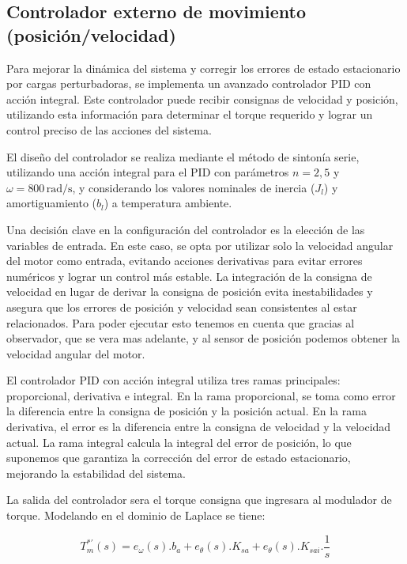 \documentclass{article}
\begin{document}

\subsection{Controlador externo de movimiento (posición/velocidad)}

Para mejorar la dinámica del sistema y corregir los errores de estado estacionario por cargas perturbadoras, 
se implementa un avanzado controlador PID con acción integral. Este controlador puede recibir consignas de 
velocidad y posición, utilizando esta información para determinar el torque requerido y lograr un control 
preciso de las acciones del sistema.

El diseño del controlador se realiza mediante el método de sintonía serie, utilizando una acción integral 
para el PID con parámetros $n=2,5$ y $\omega=800 \, \text{rad/s}$, y considerando los valores nominales de 
inercia ($J_l$) y amortiguamiento ($b_l$) a temperatura ambiente.

Una decisión clave en la configuración del controlador es la elección de las variables de entrada. En este 
caso, se opta por utilizar solo la velocidad angular del motor como entrada, evitando acciones derivativas 
para evitar errores numéricos y lograr un control más estable. La integración de la consigna de velocidad 
en lugar de derivar la consigna de posición evita inestabilidades y asegura que los errores de posición y 
velocidad sean consistentes al estar relacionados. Para poder ejecutar esto tenemos en cuenta que gracias 
al observador, que se vera mas adelante, y al sensor de posición podemos obtener la velocidad angular del motor. 

El controlador PID con acción integral utiliza tres ramas principales: proporcional, derivativa e integral. 
En la rama proporcional, se toma como error la diferencia entre la consigna de posición y la posición actual.
En la rama derivativa, el error es la diferencia entre la consigna de velocidad y la velocidad actual. La 
rama integral calcula la integral del error de posición, lo que suponemos que garantiza la corrección del 
error de estado estacionario, mejorando la estabilidad del sistema.

La salida del controlador sera el torque consigna que ingresara al modulador de torque. Modelando en el 
dominio de Laplace se tiene:

\begin{equation}\label{eq.controlador_error}
    T_m^{*\prime}(s) = e_\omega(s).b_a + e_\theta(s).K_{sa} + e_\theta(s).K_{sai}.\frac{1}{s}
\end{equation}
\end{document}
